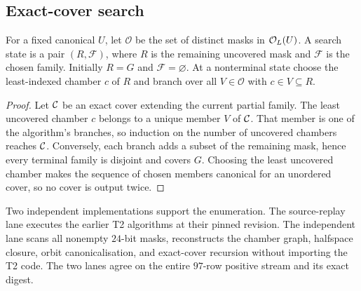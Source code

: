 \subsection{Exact-cover search}

For a fixed canonical $U$, let $\mathcal O$ be the set of distinct masks in
$\mathcal O_L(U)$.  A search state is a pair $(R,\mathcal F)$, where $R$ is the
remaining uncovered mask and $\mathcal F$ is the chosen family.  Initially
$R=G$ and $\mathcal F=\varnothing$.  At a nonterminal state choose the
least-indexed chamber $c$ of $R$ and branch over all $V\in\mathcal O$ with
$c\in V\subseteq R$.


\begin{proof}
Let $\mathcal C$ be an exact cover extending the current partial family.  The least
uncovered chamber $c$ belongs to a unique member $V$ of $\mathcal C$.  That member is
one of the algorithm's branches, so induction on the number of uncovered
chambers reaches $\mathcal C$.  Conversely, each branch adds a subset of the remaining
mask, hence every terminal family is disjoint and covers $G$.  Choosing the
least uncovered chamber makes the sequence of chosen members canonical for
an unordered cover, so no cover is output twice.
\end{proof}

Two independent implementations support the enumeration.  The source-replay
lane executes the earlier T2 algorithms at their pinned revision.  The
independent lane scans all nonempty $24$-bit masks, reconstructs the chamber
graph, halfspace closure, orbit canonicalisation, and exact-cover recursion
without importing the T2 code.  The two lanes agree on the entire $97$-row
positive stream and its exact digest.

